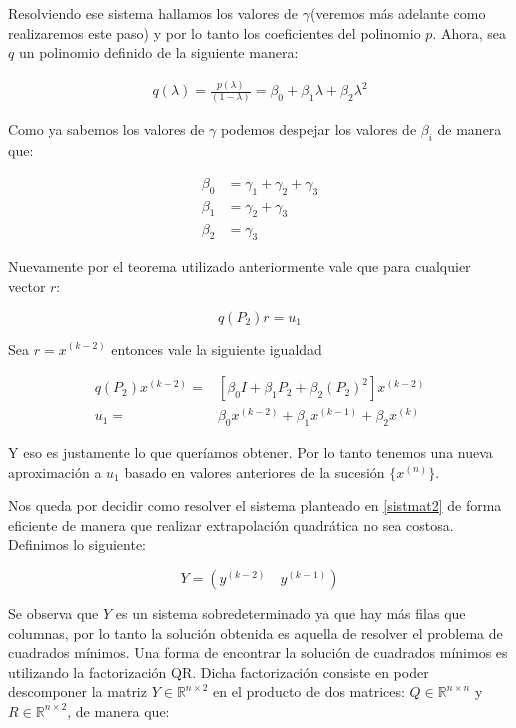 Resolviendo ese sistema hallamos los valores de $\gamma$(veremos m\'as adelante como realizaremos este paso) y por lo tanto los coeficientes del polinomio $p$. Ahora, sea $q$ un polinomio definido de la siguiente manera:

\begin{align}
	q(\lambda) = \frac{p(\lambda)}{(1-\lambda)} = \beta_{0} + \beta_{1}\lambda + \beta_{2}\lambda^{2} \label{polq}
\end{align}

Como ya sabemos los valores de $\gamma$ podemos despejar los valores de $\beta_{i}$ de manera que:

\begin{align*}
	\beta_{0} &= \gamma_{1} + \gamma_{2} + \gamma_{3} \\
	\beta_{1} &= \gamma_{2} + \gamma_{3} \\
	\beta_{2} &= \gamma_{3}
\end{align*}

Nuevamente por el teorema utilizado anteriormente vale que para cualquier vector $r$:

\[
	q(P_{2})r = u_{1}
\]

Sea $r = x^{(k-2)}$ entonces vale la siguiente igualdad

\begin{align*}
	q(P_{2})x^{(k-2)} =& [\beta_{0}I + \beta_{1}P_{2} + \beta_{2}(P_{2})^{2}]x^{(k-2)}\\
	u_{1} =& \beta_{0}x^{(k-2)} + \beta_{1}x^{(k-1)} + \beta_{2}x^{(k)}
\end{align*}

Y eso es justamente lo que quer\'iamos obtener. Por lo tanto tenemos una nueva aproximaci\'on a $u_{1}$ basado en valores anteriores de la sucesi\'on $\{x^{(n)}\}$.

Nos queda por decidir como resolver el sistema planteado en \eqref{sistmat2} de forma eficiente de manera que realizar extrapolaci\'on quadr\'atica no sea costosa. Definimos lo siguiente:

\[
	Y = \left(y^{(k-2)} \quad y^{(k-1)}\right)
\]


Se observa que $Y$ es un sistema sobredeterminado ya que hay m\'as filas que columnas, por lo tanto la soluci\'on obtenida es aquella de resolver el problema de cuadrados m\'inimos. Una forma de encontrar la soluci\'on de cuadrados m\'inimos es utilizando la factorizaci\'on QR. Dicha factorizaci\'on consiste en poder descomponer la matriz $Y \in \mathbb{R}^{n \times 2}$ en el producto de dos matrices: $Q\in \mathbb{R}^{n \times n}$ y $R\in \mathbb{R}^{n \times 2}$, de manera que:

